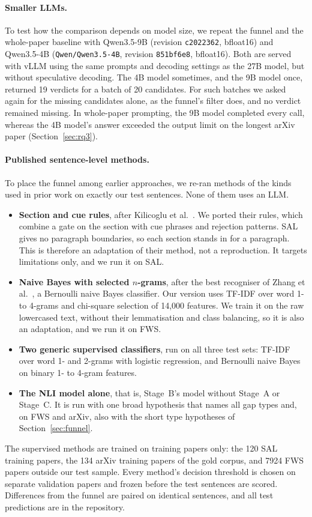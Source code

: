 \paragraph{Smaller LLMs.} To test how the comparison depends on model size, we repeat the funnel and the whole-paper baseline with Qwen3.5-9B (revision \texttt{c2022362}, bfloat16) and Qwen3.5-4B (\texttt{Qwen/Qwen3.5-4B}, revision \texttt{851bf6e8}, bfloat16). Both are served with vLLM using the same prompts and decoding settings as the 27B model, but without speculative decoding. The 4B model sometimes, and the 9B model once, returned 19 verdicts for a batch of 20 candidates. For such batches we asked again for the missing candidates alone, as the funnel's filter does, and no verdict remained missing. In whole-paper prompting, the 9B model completed every call, whereas the 4B model's answer exceeded the output limit on the longest arXiv paper (Section~\ref{sec:rq3}).

\paragraph{Published sentence-level methods.} To place the funnel among earlier approaches, we re-ran methods of the kinds used in prior work on exactly our test sentences. None of them uses an LLM.
\begin{itemize}
  \item \textbf{Section and cue rules}, after Kilicoglu et al.~\cite{kilicoglu2018automatic}. We ported their rules, which combine a gate on the section with cue phrases and rejection patterns. SAL gives no paragraph boundaries, so each section stands in for a paragraph. This is therefore an adaptation of their method, not a reproduction. It targets limitations only, and we run it on SAL.
  \item \textbf{Naive Bayes with selected $n$-grams}, after the best recogniser of Zhang et al.~\cite{zhang2023fws}, a Bernoulli naive Bayes classifier. Our version uses TF-IDF over word 1- to 4-grams and chi-square selection of 14,000 features. We train it on the raw lowercased text, without their lemmatisation and class balancing, so it is also an adaptation, and we run it on FWS.
  \item \textbf{Two generic supervised classifiers}, run on all three test sets: TF-IDF over word 1- and 2-grams with logistic regression, and Bernoulli naive Bayes on binary 1- to 4-gram features.
  \item \textbf{The NLI model alone}, that is, Stage~B's model without Stage~A or Stage~C. It is run with one broad hypothesis that names all gap types and, on FWS and arXiv, also with the short type hypotheses of Section~\ref{sec:funnel}.
\end{itemize}
The supervised methods are trained on training papers only: the 120 SAL training papers, the 134 arXiv training papers of the gold corpus, and 7924 FWS papers outside our test sample. Every method's decision threshold is chosen on separate validation papers and frozen before the test sentences are scored. Differences from the funnel are paired on identical sentences, and all test predictions are in the repository.

